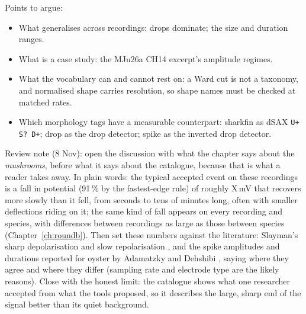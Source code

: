 \begin{instructions}
Points to argue:
\begin{itemize}
  \item What generalises across recordings: drops dominate; the size and duration ranges.
  \item What is a case study: the MJu26a CH14 excerpt's amplitude regimes.
  \item What the vocabulary can and cannot rest on: a Ward cut is not a taxonomy, and normalised shape carries
        resolution, so shape names must be checked at matched rates.
  \item Which morphology tags have a measurable counterpart: sharkfin as dSAX \texttt{U+ S? D+}; drop as the drop
        detector; spike as the inverted drop detector.
\end{itemize}
Review note (8 Nov): open the discussion with what the chapter says about the \emph{mushrooms}, before what it says about
the catalogue, because that is what a reader takes away. In plain words: the typical accepted event on these
recordings is a fall in potential (91\,\% by the fastest-edge rule) of roughly X\,mV that recovers more slowly than it
fell, from seconds to tens of minutes long, often with smaller deflections riding on it; the same kind of fall appears
on every recording and species, with differences between recordings as large as those between species
(Chapter~\ref{ch:roundb}). Then set these numbers against the literature: Slayman's sharp depolarisation and slow
repolarisation \cite{slayman}, and the spike amplitudes and durations reported for oyster by Adamatzky and Dehshibi
\cite{adamatzky2023,dehshibi}, saying where they agree and where they differ (sampling rate and electrode type are the
likely reasons). Close with the honest limit: the catalogue shows what one researcher accepted from what the tools
proposed, so it describes the large, sharp end of the signal better than its quiet background.
\end{instructions}
